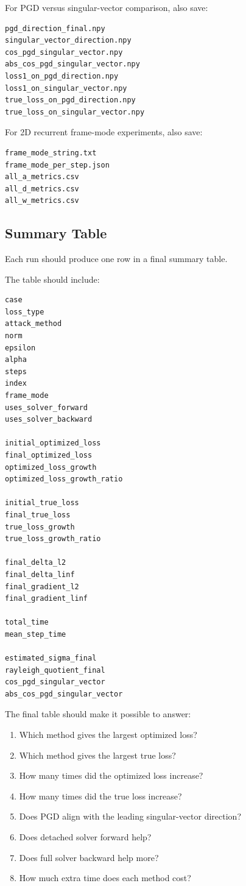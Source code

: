 \documentclass{article}
\begin{document}
For PGD versus singular-vector comparison, also save:

\begin{verbatim}
pgd_direction_final.npy
singular_vector_direction.npy
cos_pgd_singular_vector.npy
abs_cos_pgd_singular_vector.npy
loss1_on_pgd_direction.npy
loss1_on_singular_vector.npy
true_loss_on_pgd_direction.npy
true_loss_on_singular_vector.npy
\end{verbatim}

For 2D recurrent frame-mode experiments, also save:

\begin{verbatim}
frame_mode_string.txt
frame_mode_per_step.json
all_a_metrics.csv
all_d_metrics.csv
all_w_metrics.csv
\end{verbatim}

\subsection{Summary Table}

Each run should produce one row in a final summary table.

The table should include:

\begin{verbatim}
case
loss_type
attack_method
norm
epsilon
alpha
steps
index
frame_mode
uses_solver_forward
uses_solver_backward

initial_optimized_loss
final_optimized_loss
optimized_loss_growth
optimized_loss_growth_ratio

initial_true_loss
final_true_loss
true_loss_growth
true_loss_growth_ratio

final_delta_l2
final_delta_linf
final_gradient_l2
final_gradient_linf

total_time
mean_step_time

estimated_sigma_final
rayleigh_quotient_final
cos_pgd_singular_vector
abs_cos_pgd_singular_vector
\end{verbatim}

The final table should make it possible to answer:

\begin{enumerate}
    \item Which method gives the largest optimized loss?
    \item Which method gives the largest true loss?
    \item How many times did the optimized loss increase?
    \item How many times did the true loss increase?
    \item Does PGD align with the leading singular-vector direction?
    \item Does detached solver forward help?
    \item Does full solver backward help more?
    \item How much extra time does each method cost?
\end{enumerate}
\end{document}
